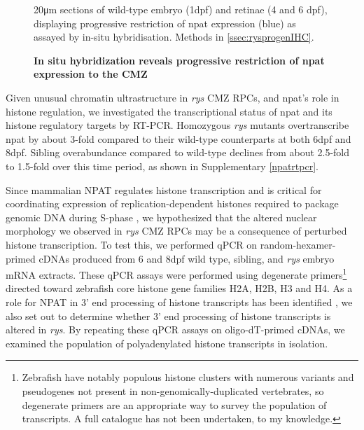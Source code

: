 \documentclass{ut-thesis}
\begin{document}
\begin{NoHyper}
\begin{figure}[!h]
    \caption{{\bf In situ hybridization reveals progressive restriction of npat expression to the CMZ}}
    20\si{\micro\metre} sections of wild-type embryo (1dpf) and retinae (4 and 6 dpf), displaying progressive restriction of npat expression (blue) as assayed by in-situ hybridisation.
    Methods in \autoref{ssec:rysprogenIHC}.
    \label{npatISH}
\end{figure}

Given unusual chromatin ultrastructure in \textit{rys} CMZ RPCs, and npat's role in histone regulation, we investigated the transcriptional status of npat and its histone regulatory targets by RT-PCR. Homozygous \textit{rys} mutants overtranscribe npat by about 3-fold compared to their wild-type counterparts at both 6dpf and 8dpf. Sibling overabundance compared to wild-type declines from about 2.5-fold to 1.5-fold over this time period, as shown in Supplementary \autoref{npatrtpcr}.

Since mammalian NPAT regulates histone transcription and is critical for coordinating expression of replication-dependent histones required to package genomic DNA during S-phase \cite{Zhao2000}, we hypothesized that the altered nuclear morphology we observed in \textit{rys} CMZ RPCs may be a consequence of perturbed histone transcription. To test this, we performed qPCR on random-hexamer-primed cDNAs produced from 6 and 8dpf wild type, sibling, and \textit{rys} embryo mRNA extracts. These qPCR assays were performed using degenerate primers\footnote{Zebrafish have notably populous histone clusters with numerous variants and pseudogenes not present in non-genomically-duplicated vertebrates, so degenerate primers are an appropriate way to survey the population of transcripts. A full catalogue has not been undertaken, to my knowledge.} directed toward zebrafish core histone gene families H2A, H2B, H3 and H4. As a role for NPAT in 3’ end processing of histone transcripts has been identified \cite{Pirngruber2010}, we also set out to determine whether 3’ end processing of histone transcripts is altered in \textit{rys}. By repeating these qPCR assays on oligo-dT-primed cDNAs, we examined the population of polyadenylated histone transcripts in isolation. 


\end{NoHyper}
\end{document}
